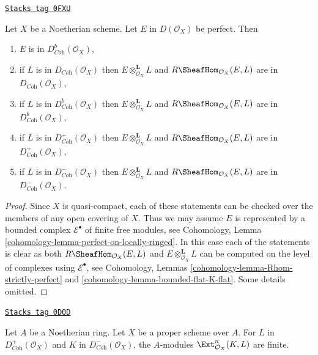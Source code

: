\begin{lemma}
\label{perfect-lemma-perfect-on-noetherian}
\href{https://stacks.math.columbia.edu/tag/0FXU}{\texttt{Stacks tag 0FXU}}

Let $X$ be a Noetherian scheme. Let $E$ in $D(\mathcal{O}_X)$ be perfect.
Then
\begin{enumerate}
\item $E$ is in $D^b_{\textit{Coh}}(\mathcal{O}_X)$,
\item if $L$ is in $D_{\textit{Coh}}(\mathcal{O}_X)$ then
$E \otimes_{\mathcal{O}_X}^\mathbf{L} L$ and
$R\SheafHom_{\mathcal{O}_X}(E, L)$ are in
$D_{\textit{Coh}}(\mathcal{O}_X)$,
\item if $L$ is in $D^b_{\textit{Coh}}(\mathcal{O}_X)$ then
$E \otimes_{\mathcal{O}_X}^\mathbf{L} L$ and
$R\SheafHom_{\mathcal{O}_X}(E, L)$ are in
$D^b_{\textit{Coh}}(\mathcal{O}_X)$,
\item if $L$ is in $D^+_{\textit{Coh}}(\mathcal{O}_X)$ then
$E \otimes_{\mathcal{O}_X}^\mathbf{L} L$ and
$R\SheafHom_{\mathcal{O}_X}(E, L)$ are in
$D^+_{\textit{Coh}}(\mathcal{O}_X)$,
\item if $L$ is in $D^-_{\textit{Coh}}(\mathcal{O}_X)$ then
$E \otimes_{\mathcal{O}_X}^\mathbf{L} L$ and
$R\SheafHom_{\mathcal{O}_X}(E, L)$ are in
$D^-_{\textit{Coh}}(\mathcal{O}_X)$.
\end{enumerate}
\end{lemma}

\begin{proof}
Since $X$ is quasi-compact, each of these statements can be checked
over the members of any open covering of $X$.
Thus we may assume $E$ is represented by
a bounded complex $\mathcal{E}^\bullet$ of finite free modules, see
Cohomology, Lemma \ref{cohomology-lemma-perfect-on-locally-ringed}.
In this case each of the statements is clear as both
$R\SheafHom_{\mathcal{O}_X}(E, L)$
and $E \otimes_{\mathcal{O}_X}^\mathbf{L} L$ can be computed on the
level of complexes using $\mathcal{E}^\bullet$, see
Cohomology, Lemmas \ref{cohomology-lemma-Rhom-strictly-perfect} and
\ref{cohomology-lemma-bounded-flat-K-flat}. Some details omitted.
\end{proof}

\begin{lemma}
\label{perfect-lemma-ext-finite}
\href{https://stacks.math.columbia.edu/tag/0D0D}{\texttt{Stacks tag 0D0D}}

Let $A$ be a Noetherian ring. Let $X$ be a proper scheme over $A$.
For $L$ in
$D^+_{\textit{Coh}}(\mathcal{O}_X)$ and $K$ in
$D^-_{\textit{Coh}}(\mathcal{O}_X)$, the $A$-modules
$\Ext_{\mathcal{O}_X}^n(K, L)$ are finite.
\end{lemma}

